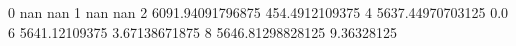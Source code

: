 0 nan nan
1 nan nan
2 6091.94091796875 454.4912109375
4 5637.44970703125 0.0
6 5641.12109375 3.67138671875
8 5646.81298828125 9.36328125
